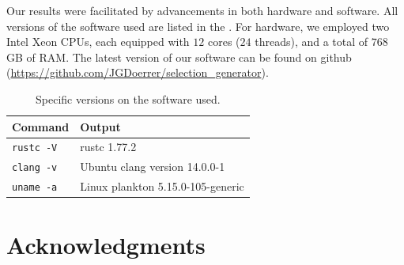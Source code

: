 \documentclass[twoside,leqno,twocolumn]{article}
\begin{document}
Our results were facilitated by advancements in both hardware and software.
All versions of the software used are listed in the .
For hardware, we employed two Intel Xeon CPUs, each equipped with $12$ cores ($24$ threads), and a total of $768$ GB of RAM.
The latest version of our software can be found on github (\url{https://github.com/JGDoerrer/selection_generator}).

\begin{table}[!t]
  \renewcommand{\arraystretch}{1.2}
  \caption{Specific versions on the software used.}
  \label{table:command_outputs}
  \centering
  \begin{tabular}{l|l}
    \textbf{Command}  & \textbf{Output}                   \\ \hline
    \texttt{rustc -V} & rustc 1.77.2                      \\ \hline
    \texttt{clang -v} & Ubuntu clang version 14.0.0-1     \\ \hline
    \texttt{uname -a} & Linux plankton 5.15.0-105-generic \\
  \end{tabular}
\end{table}

\section*{Acknowledgments}


\end{document}
